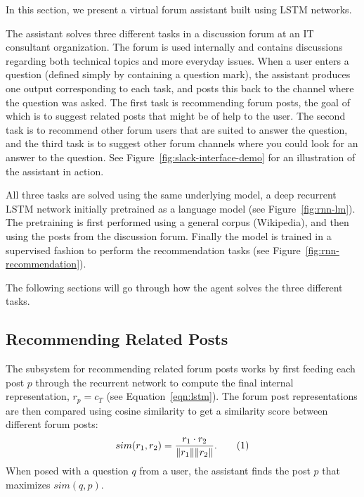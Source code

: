 \documentclass[11pt]{article}
\newcommand\numberthis{\addtocounter{equation}{1}\tag{\theequation}}
\newenvironment{critical}{\par\color{red}}{\par}
\newenvironment{critical}{\par\color{black}}{\par}
\begin{document}
In this section, we present a virtual forum assistant built using LSTM networks.

The assistant solves three different tasks in a discussion forum at an IT consultant organization. The forum is used internally and contains discussions regarding both technical topics and more everyday issues. When a user enters a question (defined simply by containing a question mark), the assistant produces one output corresponding to each task, and posts this back to the channel where the question was asked. 
The first task is recommending forum posts, the goal of which is to suggest related posts that might be of help to the user.
The second task is to recommend other forum users that are suited to answer the question, and the third task is to suggest other forum channels where you could look for an answer to the question.
See Figure~\ref{fig:slack-interface-demo} for an illustration of the assistant in action.

All three tasks are solved using the same underlying model, a deep recurrent LSTM network initially pretrained as a language model (see Figure~\ref{fig:rnn-lm}). The pretraining is first performed using a general corpus (Wikipedia), and then using the posts from the discussion forum. Finally the model is trained in a supervised fashion to perform the recommendation tasks (see Figure~\ref{fig:rnn-recommendation}).

The following sections will go through how the agent solves the three different tasks.

\subsection{Recommending Related Posts}


The subsystem for recommending related forum posts works by first feeding each post $p$ through the recurrent network to compute the final internal representation, $r_p = c_T$ (see Equation~\ref{eqn:lstm}).
The forum post representations are then compared using cosine similarity to get a similarity score between different forum posts:
\[ sim(r_{1}, r_{2}) = \frac{r_1 \cdot r_2}{\| r_1 \| \| r_2 \| }.\numberthis \label{eqn:cos-sim} \]
When posed with a question $q$ from a user, the assistant finds the post $p$ that maximizes $sim(q,p)$.
\end{document}
